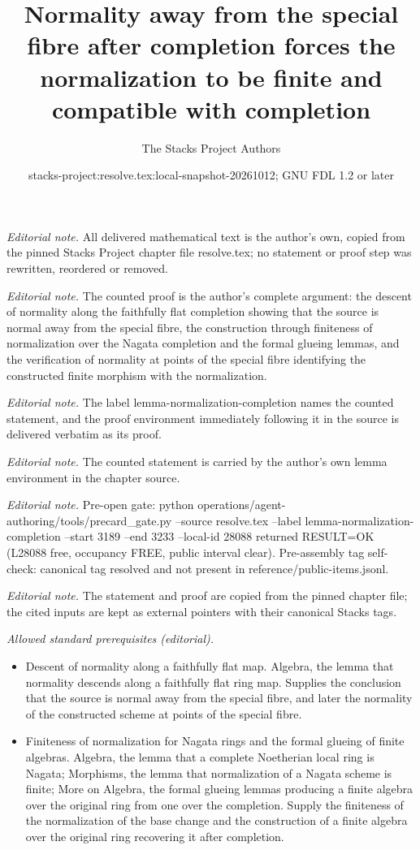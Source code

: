 \documentclass[10pt,a4paper]{amsart}
\title{Normality away from the special fibre after completion forces the normalization to be finite and compatible with completion}
\author{The Stacks Project Authors}
\date{stacks-project:resolve.tex:local-snapshot-20261012; GNU FDL 1.2 or later}
\theoremstyle{plain}
\theoremstyle{definition}
\theoremstyle{remark}
\numberwithin{equation}{subsection}
\begin{document}
\maketitle
\noindent\textit{Editorial note.} All delivered mathematical text is the author's own, copied from the pinned Stacks Project chapter file resolve.tex; no statement or proof step was rewritten, reordered or removed.\par\medskip
\noindent\textit{Editorial note.} The counted proof is the author's complete argument: the descent of normality along the faithfully flat completion showing that the source is normal away from the special fibre, the construction through finiteness of normalization over the Nagata completion and the formal glueing lemmas, and the verification of normality at points of the special fibre identifying the constructed finite morphism with the normalization.\par\medskip
\noindent\textit{Editorial note.} The label lemma-normalization-completion names the counted statement, and the proof environment immediately following it in the source is delivered verbatim as its proof.\par\medskip
\noindent\textit{Editorial note.} The counted statement is carried by the author's own lemma environment in the chapter source.\par\medskip
\noindent\textit{Editorial note.} Pre-open gate: python operations/agent-authoring/tools/precard\_gate.py --source resolve.tex --label lemma-normalization-completion --start 3189 --end 3233 --local-id 28088 returned RESULT=OK (L28088 free, occupancy FREE, public interval clear). Pre-assembly tag self-check: canonical tag resolved and not present in reference/public-items.jsonl.\par\medskip
\noindent\textit{Editorial note.} The statement and proof are copied from the pinned chapter file; the cited inputs are kept as external pointers with their canonical Stacks tags.\par\medskip
\noindent\textit{Allowed standard prerequisites (editorial).}\begin{itemize}
\item Descent of normality along a faithfully flat map. Algebra, the lemma that normality descends along a faithfully flat ring map. Supplies the conclusion that the source is normal away from the special fibre, and later the normality of the constructed scheme at points of the special fibre.
\item Finiteness of normalization for Nagata rings and the formal glueing of finite algebras. Algebra, the lemma that a complete Noetherian local ring is Nagata; Morphisms, the lemma that normalization of a Nagata scheme is finite; More on Algebra, the formal glueing lemmas producing a finite algebra over the original ring from one over the completion. Supply the finiteness of the normalization of the base change and the construction of a finite algebra over the original ring recovering it after completion.
\end{itemize}\medskip
\end{document}
